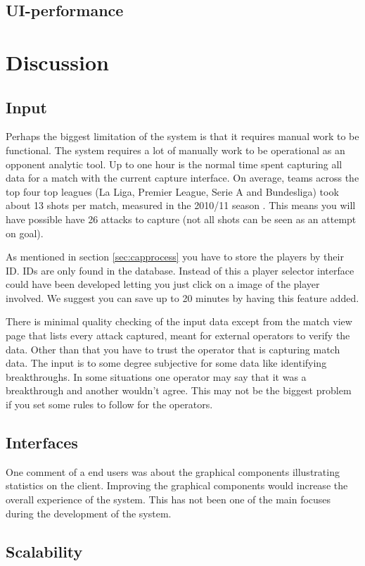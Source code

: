\subsection{UI-performance}

\section{Discussion}
\subsection{Input}

Perhaps the biggest limitation of the system is that it requires manual work to be functional. The system requires a lot of manually work to be operational as an opponent analytic tool. Up to one hour is the normal time spent capturing all data for a match with the current capture interface. On average, teams across the top four top leagues (La Liga, Premier League, Serie A and Bundesliga) took about 13 shots per match, measured in the 2010/11 season \cite{soccerbynumbers}. This means you will have possible have 26 attacks to capture (not all shots can be seen as an attempt on goal).

As mentioned in section \ref{sec:capprocess} you have to store the players by their ID. IDs are only found in the database. Instead of this a player selector interface could have been developed letting you just click on a image of the player involved. We suggest you can save up to 20 minutes by having this feature added.

There is minimal quality checking of the input data except from the match view page that lists every attack captured, meant for external operators to verify the data. Other than that you have to trust the operator that is capturing match data. The input is to some degree subjective for some data like identifying breakthroughs. In some situations one operator may say that it was a breakthrough and another wouldn't agree. This may not be the biggest problem if you set some rules to follow for the operators.

\subsection{Interfaces}

One comment of a end users was about the graphical components illustrating statistics on the client. Improving the graphical components would increase the overall experience of the system. This has not been one of the main focuses during the development of the system.

\subsection{Scalability}

